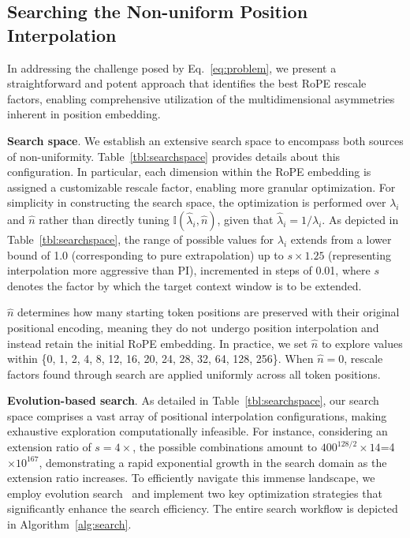 \subsection{Searching the Non-uniform Position Interpolation}

In addressing the challenge posed by Eq.~\ref{eq:problem}, we present a straightforward and potent approach that identifies the best RoPE rescale factors, enabling comprehensive utilization of the multidimensional asymmetries inherent in position embedding.

\textbf{Search space}. We establish an extensive search space to encompass both sources of non-uniformity. Table~\ref{tbl:searchspace} provides details about this configuration. In particular, each dimension within the RoPE embedding is assigned a customizable rescale factor, enabling more granular optimization. For simplicity in constructing the search space, the optimization is performed over $\lambda_i$ and $\hat{n}$ rather than directly tuning $\mathbb{I}(\hat{\lambda}_{i},\hat{n})$, given that $\hat{\lambda}_{i}=1/\lambda_i$. As depicted in Table~\ref{tbl:searchspace}, the range of possible values for $\lambda_i$ extends from a lower bound of 1.0 (corresponding to pure extrapolation) up to $s\times1.25$ (representing interpolation more aggressive than PI), incremented in steps of 0.01, where $s$ denotes the factor by which the target context window is to be extended.

$\hat{n}$ determines how many starting token positions are preserved with their original positional encoding, meaning they do not undergo position interpolation and instead retain the initial RoPE embedding. In practice, we set $\hat{n}$ to explore values within \{0, 1, 2, 4, 8, 12, 16, 20, 24, 28, 32, 64, 128, 256\}. When $\hat{n}=0$, rescale factors found through search are applied uniformly across all token positions.

\textbf{Evolution-based search}. As detailed in Table~\ref{tbl:searchspace}, our search space comprises a vast array of positional interpolation configurations, making exhaustive exploration computationally infeasible. For instance, considering an extension ratio of $s=4\times$, the possible combinations amount to $400^{128/2}\times14$=4$\times10^{167}$, demonstrating a rapid exponential growth in the search domain as the extension ratio increases. To efficiently navigate this immense landscape, we employ evolution search~\cite{guo2020single} and implement two key optimization strategies that significantly enhance the search efficiency. The entire search workflow is depicted in Algorithm~\ref{alg:search}.

